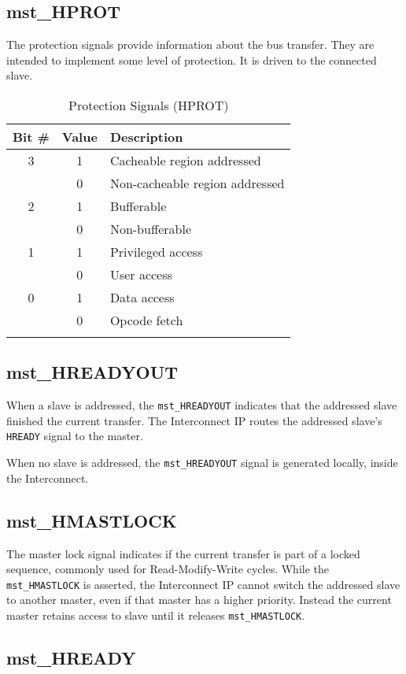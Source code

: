 \subsection{mst\_HPROT}\label{mst_hprot}

The protection signals provide information about the bus transfer. They
are intended to implement some level of protection. It is driven to the
connected slave.

\begin{longtable}[]{@{}ccl@{}}
\toprule
Bit \# & Value & Description\tabularnewline
\midrule
\endhead
3 & 1 & Cacheable region addressed\tabularnewline
& 0 & Non-cacheable region addressed\tabularnewline
2 & 1 & Bufferable\tabularnewline
& 0 & Non-bufferable\tabularnewline
1 & 1 & Privileged access\tabularnewline
& 0 & User access\tabularnewline
0 & 1 & Data access\tabularnewline
& 0 & Opcode fetch\tabularnewline
\bottomrule
\caption{Protection Signals (HPROT)}
\end{longtable}

\subsection{mst\_HREADYOUT}\label{mst_hreadyout}

When a slave is addressed, the \texttt{mst\_HREADYOUT} indicates that the
addressed slave finished the current transfer. The Interconnect IP
routes the addressed slave's \texttt{HREADY} signal to the master.

When no slave is addressed, the \texttt{mst\_HREADYOUT} signal is generated
locally, inside the Interconnect.

\subsection{mst\_HMASTLOCK}\label{mst_hmastlock}

The master lock signal indicates if the current transfer is part of a
locked sequence, commonly used for Read-Modify-Write cycles. While the
\texttt{mst\_HMASTLOCK} is asserted, the Interconnect IP cannot switch the
addressed slave to another master, even if that master has a higher
priority. Instead the current master retains access to slave until it
releases \texttt{mst\_HMASTLOCK}.

\subsection{mst\_HREADY}\label{mst_hready}

